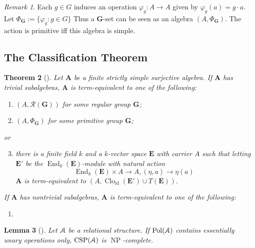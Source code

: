 \documentclass{amsart}
\theoremstyle{plain}
\newtheorem{theorem}{Theorem}[section]
\newtheorem{lemma}[theorem]{Lemma}
\theoremstyle{definition}
\theoremstyle{remark}
\newtheorem{remark}[theorem]{Remark}
\def\phi{\varphi}
\DeclareMathOperator{\Clo}{Clo}
\DeclareMathOperator{\CSP}{CSP}
\DeclareMathOperator{\Pol}{Pol}
\DeclareMathOperator{\NP}{NP}
\DeclareMathOperator{\id}{id}
\DeclareMathOperator{\End}{End}
\begin{document}
\begin{remark}
    Each $g \in G$ induces an operation $\phi_g: A \to A$ given by $\phi_g(a)=g \cdot a$. 
    Let $\Phi_\mathbf{G}:=\{\phi_g: g \in G\}$
    Thus a $\mathbf{G}$-set can be seen as an algebra $(A, \Phi_\mathbf{G})$. 
    The action is primitive iff this algebra is simple. 
\end{remark}

\subsection{The Classification Theorem}

\begin{theorem}
    [\cite{classification}]
    Let $\mathbf{A}$ be a finite strictly simple surjective algebra. 
    If $\mathbf{A}$ has trivial subalgebras, $\mathbf{A}$ is term-equivalent to one of the following: 
    \begin{enumerate}
        \item \label{one} $(A,\mathcal{R}(\mathbf{G}))$ for some regular group $\mathbf{G}$;
        \item \label{three} $(A, \Phi_\mathbf{G})$ for some primitive group $\mathbf{G}$; 
    \end{enumerate}
    or 
    \begin{enumerate}
        \setcounter{enumi}{2}
        \item there is a finite field $k$ and a $k$-vector space $\mathbf{E}$ with carrier $A$ such that letting $\mathbf{E}'$ be the $\End_k(\mathbf{E})$-module with natural action 
    \begin{equation*}
        \End_k(\mathbf{E}) \times A \to A, (\eta, a) \to \eta(a)  
    \end{equation*}
    $\mathbf{A}$ is term-equivalent to $(A, \Clo_{\id}(\mathbf{E}') \cup T(\mathbf{E}))$. 
    \end{enumerate}
    If $\mathbf{A}$ has nontrivial subalgebras, $\mathbf{A}$ is term-equivalent to one of the following: 
    \begin{enumerate}
        \item 
    \end{enumerate}
\end{theorem}

\begin{lemma}[\cite{jeavons}]
    Let $\EuScript{A}$ be a relational structure. 
    If $\Pol(\EuScript{A})$ contains essentially unary operations only, $\CSP(\EuScript{A})$ is $\NP$-complete. 
\end{lemma}
\end{document}
